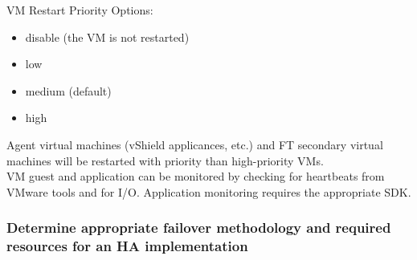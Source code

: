 VM Restart Priority Options:

\begin{itemize}
\item disable (the VM is not restarted)
\item low
\item medium (default)
\item high
\end{itemize}

Agent virtual machines (vShield applicances, etc.) and FT secondary virtual
machines will be restarted with priority than high-priority VMs.\\

VM guest and application can be monitored by checking for heartbeats from
VMware tools and for I/O. Application monitoring requires the appropriate SDK.

\subsubsection{Determine appropriate failover methodology and required resources for an HA implementation}
